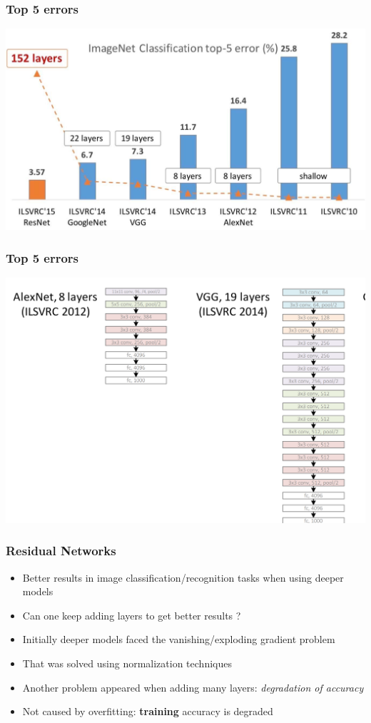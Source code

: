 \documentclass{beamer}
\begin{document}
\begin{frame}
    \frametitle{Top 5 errors}
    \includegraphics[width=\textwidth]{figs/top-5.png}
   \href{https://icml.cc/2016/tutorials/icml2016_tutorial_deep_residual_networks_kaiminghe.pdf}{}
\end{frame}



\begin{frame}
    \frametitle{Top 5 errors}
    \includegraphics[width=\textwidth]{figs/alex-vgg.png}
   \href{https://icml.cc/2016/tutorials/icml2016_tutorial_deep_residual_networks_kaiminghe.pdf}{}
\end{frame}

\begin{frame}
	\frametitle{Residual Networks}
\begin{itemize}
	\item Better results in image classification/recognition tasks when using deeper models 
	\item Can one keep adding layers  to get better results ?
	\item Initially deeper models faced the vanishing/exploding gradient problem
	\item That was solved using normalization techniques
	\item Another problem appeared when adding many layers: \textit{degradation of accuracy}
	\item Not caused by overfitting: \textbf{training} accuracy is degraded 
\end{itemize}
\end{frame}
\end{document}
